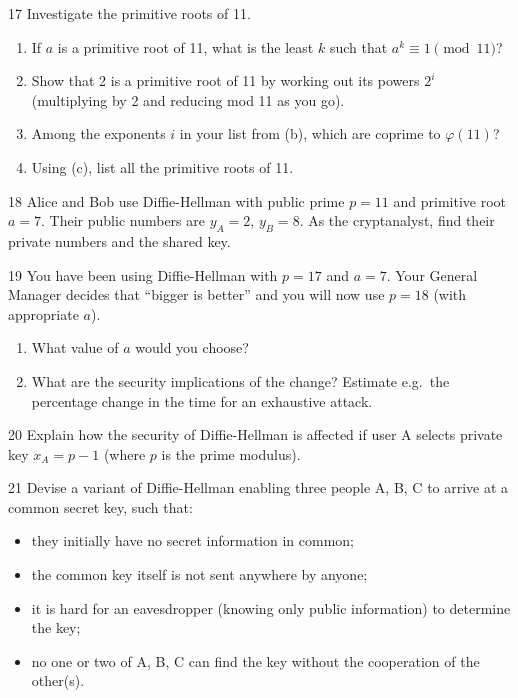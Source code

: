 \begin{exercise}{17}
    Investigate the primitive roots of 11.
    \begin{enumerate}[label=(\alph*)]
        \item If $a$ is a primitive root of 11, what is the least $k$ such that
              $a^k\equiv1\pmod{11}$?
        \item Show that 2 is a primitive root of 11 by working out its powers
              $2^i$ (multiplying by 2 and reducing mod 11 as you go).
        \item Among the exponents $i$ in your list from (b), which are coprime to
              $\varphi(11)$?
        \item Using (c), list all the primitive roots of 11.
    \end{enumerate}
\end{exercise}

\begin{exercise}{18}
    Alice and Bob use Diffie-Hellman with public prime $p=11$ and primitive root
    $a=7$. Their public numbers are $y_A=2$, $y_B=8$. As the cryptanalyst, find
    their private numbers and the shared key.
\end{exercise}

\begin{exercise}{19}
    You have been using Diffie-Hellman with $p=17$ and $a=7$. Your General
    Manager decides that ``bigger is better'' and you will now use $p=18$ (with
    appropriate $a$).
    \begin{enumerate}[label=(\alph*)]
        \item What value of $a$ would you choose?
        \item What are the security implications of the change? Estimate e.g.\
              the percentage change in the time for an exhaustive attack.
    \end{enumerate}
\end{exercise}

\begin{exercise}{20}
    Explain how the security of Diffie-Hellman is affected if user A selects
    private key $x_A=p-1$ (where $p$ is the prime modulus).
\end{exercise}

\begin{exercise}{21}
    Devise a variant of Diffie-Hellman enabling three people A, B, C to arrive at
    a common secret key, such that:
    \begin{itemize}
        \item they initially have no secret information in common;
        \item the common key itself is not sent anywhere by anyone;
        \item it is hard for an eavesdropper (knowing only public information)
              to determine the key;
        \item no one or two of A, B, C can find the key without the cooperation
              of the other(s).
    \end{itemize}
\end{exercise}

